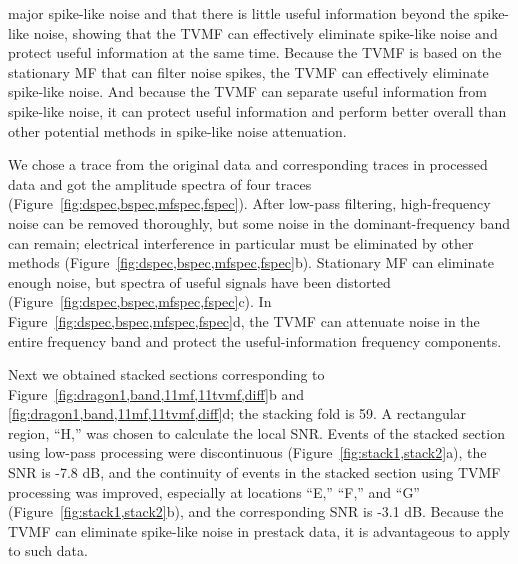 major spike-like noise and that there is little useful information beyond 
the spike-like noise, showing that the TVMF can effectively eliminate spike-like noise and 
protect useful information at the same time. Because the TVMF is based on the stationary MF that can 
filter noise spikes, the TVMF can effectively eliminate spike-like noise. And because the TVMF 
can separate useful information from spike-like noise, 
it can protect useful information and perform better overall than other potential methods 
in spike-like noise attenuation.

We chose a trace from the original data and corresponding traces in processed data and got the 
amplitude spectra of four traces (Figure~\ref{fig:dspec,bspec,mfspec,fspec}). After 
low-pass filtering, high-frequency noise can be removed thoroughly, but 
some noise in the dominant-frequency band can remain; 
electrical interference in particular must be eliminated by other methods (Figure~\ref{fig:dspec,bspec,mfspec,fspec}b). Stationary
MF can eliminate enough noise, but spectra of useful signals have been distorted (Figure~\ref{fig:dspec,bspec,mfspec,fspec}c). 
In Figure~\ref{fig:dspec,bspec,mfspec,fspec}d, the TVMF can attenuate noise in the entire frequency band and protect 
the useful-information frequency components. 


Next we obtained stacked sections corresponding to Figure~\ref{fig:dragon1,band,11mf,11tvmf,diff}b 
and \ref{fig:dragon1,band,11mf,11tvmf,diff}d; the stacking fold is 59. A rectangular region, ``H,'' was chosen 
to calculate the local SNR. Events of the stacked section using low-pass 
processing were discontinuous (Figure~\ref{fig:stack1,stack2}a), the SNR is -7.8 dB, 
and the continuity of events in the stacked section using TVMF processing was improved, especially 
at locations ``E,'' ``F,'' and ``G'' (Figure~\ref{fig:stack1,stack2}b), and the 
corresponding SNR is -3.1 dB. Because the TVMF can eliminate spike-like noise 
in prestack data, it is advantageous to apply to such data.

